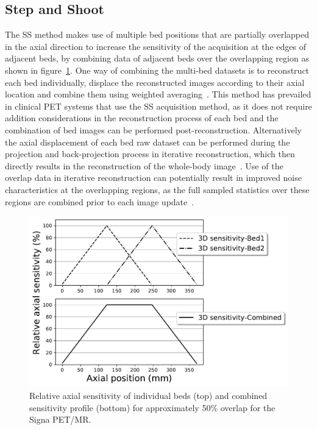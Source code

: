 \subsection{Step and Shoot}
\label{WB_Static_SS}
The SS method makes use of multiple bed positions that are partially overlapped in the axial direction to increase the sensitivity of the acquisition at the edges of adjacent beds, by combining data of adjacent beds over the overlapping region as shown in figure~\ref{fig3_1:fullOverlap}. 
One way of combining the multi-bed datasets is to reconstruct each bed individually, displace the reconstructed images according to their axial location and combine them using weighted averaging~\cite{Schubert1996}. This method has prevailed in clinical PET systems that use the SS acquisition method, as it does not require addition considerations in the reconstruction process of each bed and the combination of bed images can be performed post-reconstruction. Alternatively the axial displacement of each bed raw dataset can be performed during the projection and back-projection process in iterative reconstruction, which then directly results in the reconstruction of the whole-body image~\cite{Ross2004}. Use of the overlap data in iterative reconstruction can potentially result in improved noise characteristics at the overlapping regions, as the full sampled statistics over these regions are combined prior to each image update~\cite{Ross2004,Stute2014}. 
%
\begin{figure} [ht!]
\centering
\includegraphics[scale=0.6,angle=0]{2_Theory_Methods/figures/SensitivityProfiles_fullOverlap.pdf}
\caption{Relative axial sensitivity of individual beds (top) and combined sensitivity profile (bottom) for approximately 50\% overlap for the Signa PET/MR.}
\label{fig3_1:fullOverlap}
\end{figure}
